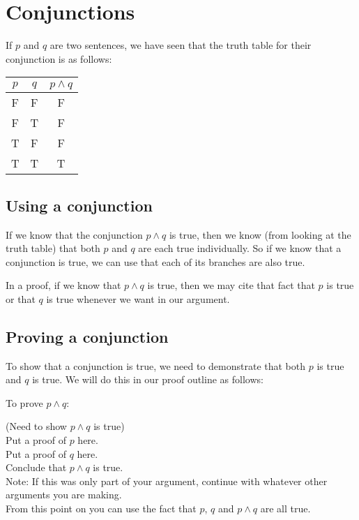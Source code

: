 \newpage

\section{Conjunctions}

If $p$ and $q$ are two sentences, we have seen that the truth table for their conjunction is as follows:

\begin{table}[h]
	\centering
	\begin{tabular}{c|c|c}
		$p$ & $q$ & $p \wedge q$ 	\\ \hline
		F & F & F 	\\ \hline
		F & T & F 	\\ \hline
		T & F & F 	\\ \hline
		T &  T & T 	\\ \hline
	\end{tabular}
\end{table}

\subsection{Using a conjunction}  If we know that the conjunction $p \wedge q$ is true, then we know (from looking at the truth table) that both $p$ and $q$ are each true individually.  So if we know that a conjunction is true, we can use that each of its branches are also true.

In a proof, if we know that $p \wedge q$ is true, then we may cite that fact that $p$ is true or that $q$ is true whenever we want in our argument. 

\subsection{Proving a conjunction}  To show that a conjunction is true, we need to demonstrate that both $p$ is true and $q$ is true.  We will do this in our proof outline as follows:

To prove $p \wedge q$:

\begin{fitch*}
		\textrm{(Need to show $p \wedge q$ is true)}\\
		\textrm{Put a proof of $p$ here.}\\
		\textrm{Put a proof of $q$ here.}\\
		\textrm{Conclude that $p \wedge q$ is true.}\\
		\textrm{Note: If this was only part of your argument, continue with whatever other arguments you are making.}\\ \textrm{ \hphantom{Note:}From this point on you can use the fact that $p$, $q$ and $p \wedge q$ are all true.}\\
	\end{fitch*}

